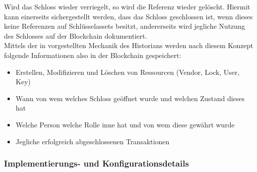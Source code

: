         Wird das Schloss wieder verriegelt, so wird die Referenz wieder gelöscht. 
        Hiermit kann einerseits sichergestellt werden, dass das Schloss geschlossen ist, wenn dieses keine Referenzen auf Schlüsselassets besitzt, andererseits wird jegliche Nutzung des Schlosses auf der Blockchain dokumentiert. 
        \medskip\\
        \noindent Mittels der in  vorgestellten Mechanik des Historians werden nach diesem Konzept folgende Informationen also in der Blockchain gespeichert:
        \begin{itemize}[noitemsep]
            \item Erstellen, Modifizieren und Löschen von Ressourcen (Vendor, Lock, User, Key)
            \item Wann von wem welches Schloss geöffnet wurde und welchen Zustand dieses hat
            \item Welche Person welche Rolle inne hat und von wem diese gewährt wurde
            \item Jegliche erfolgreich abgeschlossenen Transaktionen
        \end{itemize}
        
    \subsubsection{Implementierungs- und Konfigurationsdetails}
